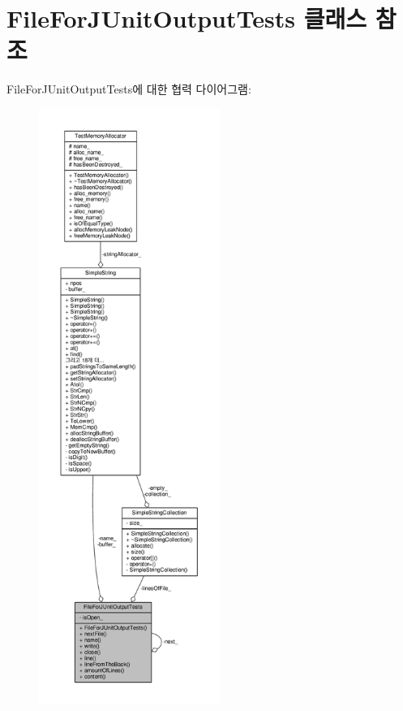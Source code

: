\hypertarget{class_file_for_j_unit_output_tests}{}\section{File\+For\+J\+Unit\+Output\+Tests 클래스 참조}
\label{class_file_for_j_unit_output_tests}


File\+For\+J\+Unit\+Output\+Tests에 대한 협력 다이어그램\+:
\nopagebreak
\begin{figure}[H]
\begin{center}
\leavevmode
\includegraphics[height=550pt]{class_file_for_j_unit_output_tests__coll__graph}
\end{center}
\end{figure}
